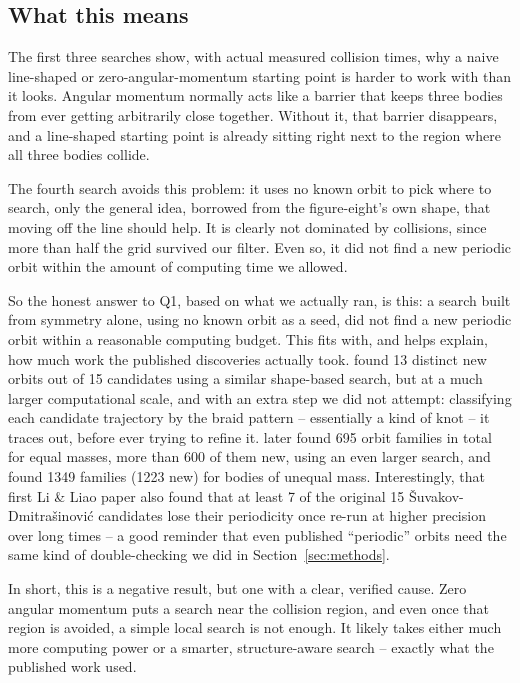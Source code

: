 \documentclass[11pt]{article}
\begin{document}
\subsection{What this means}

The first three searches show, with actual measured collision times, why
a naive line-shaped or zero-angular-momentum starting point is harder to
work with than it looks. Angular momentum normally acts like a barrier
that keeps three bodies from ever getting arbitrarily close together.
Without it, that barrier disappears, and a line-shaped starting point is
already sitting right next to the region where all three bodies collide.

The fourth search avoids this problem: it uses no known orbit to pick
where to search, only the general idea, borrowed from the figure-eight's
own shape, that moving off the line should help. It is clearly not
dominated by collisions, since more than half the grid survived our
filter. Even so, it did not find a new periodic orbit within the amount of
computing time we allowed.

So the honest answer to Q1, based on what we actually ran, is this: a
search built from symmetry alone, using no known orbit as a seed, did not
find a new periodic orbit within a reasonable computing budget. This fits
with, and helps explain, how much work the published discoveries actually
took. \citet{SuvakovDmitrasinovic2013} found 13 distinct new orbits out of
15 candidates using a similar shape-based search, but at a much larger
computational scale, and with an extra step we did not attempt:
classifying each candidate trajectory by the braid pattern -- essentially
a kind of knot -- it traces out, before ever trying to refine it.
\citet{LiLiao2017} later found 695 orbit families in total for equal
masses, more than 600 of them new, using an even larger search, and
\citet{LiJingLiao2018} found 1349 families (1223 new) for bodies of
unequal mass. Interestingly, that first Li \& Liao paper also found that
at least 7 of the original 15 Šuvakov-Dmitrašinović candidates lose their
periodicity once re-run at higher precision over long times -- a good
reminder that even published ``periodic'' orbits need the same kind of
double-checking we did in Section~\ref{sec:methods}.

In short, this is a negative result, but one with a clear, verified
cause. Zero angular momentum puts a search near the collision region, and
even once that region is avoided, a simple local search is not enough. It
likely takes either much more computing power or a smarter,
structure-aware search -- exactly what the published work used.
\end{document}
